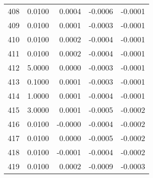 \begin{longtable}{lrrrr}
408 & 0.0100 & 0.0004 & -0.0006 & -0.0001 \\
409 & 0.0100 & 0.0001 & -0.0003 & -0.0001 \\
410 & 0.0100 & 0.0002 & -0.0004 & -0.0001 \\
411 & 0.0100 & 0.0002 & -0.0004 & -0.0001 \\
412 & 5.0000 & 0.0000 & -0.0003 & -0.0001 \\
413 & 0.1000 & 0.0001 & -0.0003 & -0.0001 \\
414 & 1.0000 & 0.0001 & -0.0004 & -0.0001 \\
415 & 3.0000 & 0.0001 & -0.0005 & -0.0002 \\
416 & 0.0100 & -0.0000 & -0.0004 & -0.0002 \\
417 & 0.0100 & 0.0000 & -0.0005 & -0.0002 \\
418 & 0.0100 & -0.0001 & -0.0004 & -0.0002 \\
419 & 0.0100 & 0.0002 & -0.0009 & -0.0003 \\
\end{longtable}
